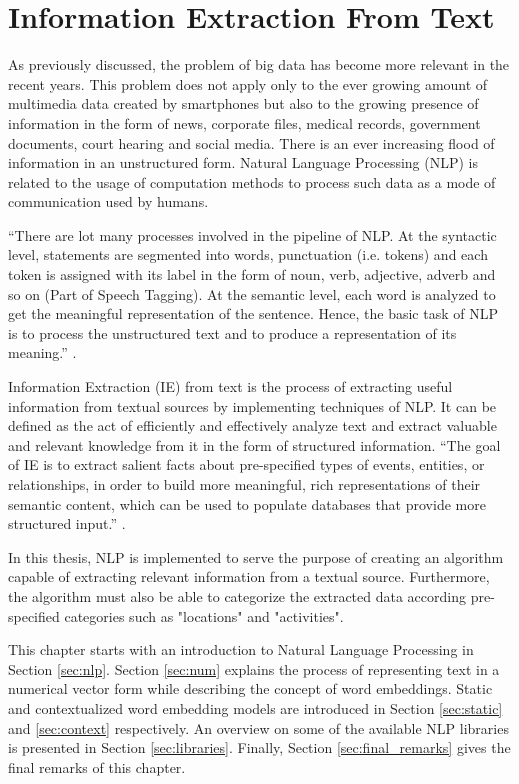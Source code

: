 \cleardoublepage


\chapter{Information Extraction From Text}
\label{ch:nlp}

As previously discussed, the problem of big data has become more relevant in the recent years.  This problem does not apply only to the ever growing amount of multimedia data created by smartphones but also to the growing presence of information in the form of news, corporate files, medical records, government documents, court hearing and social media. There is an ever increasing flood of information in an unstructured form. Natural Language Processing (NLP) is related to the usage of computation methods to process such data as a mode of communication used by humans.

``There are lot many processes involved in the pipeline of NLP. At the syntactic level, statements are segmented into words, punctuation (i.e.  tokens) and each token is assigned with its label in the form of noun, verb, adjective, adverb and so on (Part of Speech Tagging).  At the semantic level, each word is analyzed to get the meaningful representation of the sentence.  Hence, the basic task of NLP is to process the unstructured text and to produce a representation of its meaning.''  \cite{singh2018natural}.



Information Extraction (IE) from text is the process of extracting useful information from textual sources by implementing techniques of NLP. It can be defined as the act of efficiently and effectively analyze text and extract valuable and relevant knowledge from it in the form of structured information. ``The goal of IE is to extract salient facts about pre-specified types of events, entities, or relationships, in order to build more meaningful, rich representations of their semantic content, which can be used to populate databases that provide more structured input.'' \cite{singh2018natural}.

In this thesis, NLP is implemented to serve the purpose of creating an algorithm capable of extracting relevant information from a textual source. Furthermore, the algorithm must also be able to categorize the extracted data according pre-specified categories such as "locations" and "activities".

This chapter starts with an introduction to Natural Language Processing in Section \ref{sec:nlp}. Section \ref{sec:num} explains the process of representing text in a numerical vector form while describing the concept of word embeddings. Static and contextualized word embedding models are introduced in Section \ref{sec:static} and \ref{sec:context} respectively. An overview on some of the available NLP libraries is presented in Section \ref{sec:libraries}. Finally, Section \ref{sec:final_remarks} gives the final remarks of this chapter.

